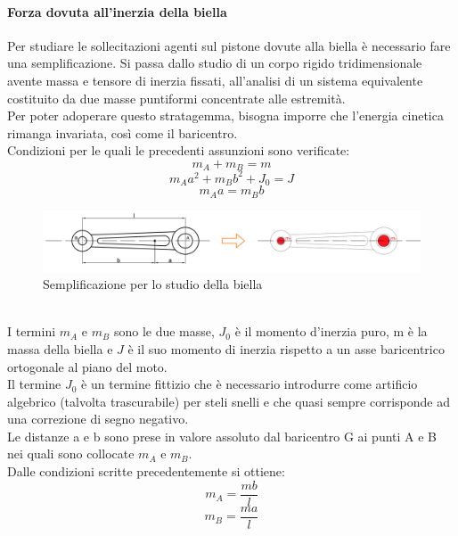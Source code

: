\paragraph{Forza dovuta all'inerzia della biella} Per studiare le sollecitazioni agenti sul pistone dovute alla biella è necessario fare una semplificazione. Si passa dallo studio di un corpo rigido tridimensionale avente massa e tensore di inerzia fissati, all’analisi di un sistema equivalente costituito da due masse puntiformi concentrate alle estremità.\\
Per poter adoperare questo stratagemma, bisogna imporre che l’energia cinetica rimanga invariata, così come il baricentro.\\
Condizioni per le quali le precedenti assunzioni sono verificate: 
\begin{equation}
    m_A+m_B=m
\end{equation}
\begin{equation}
    m_Aa^2+m_Bb^2+J_0=J
\end{equation}
\begin{equation}
    m_Aa=m_Bb
\end{equation}
\begin{figure}[h]
\centering
\includegraphics[scale=0.3]{Immagini/SostituzioneBiella.png}
\caption{Semplificazione per lo studio della biella}
\label{fig:SostituzioneBiella}
\end{figure}
\\
I termini $m_A$ e $m_B$ sono le due masse, $J_0$ è il momento d'inerzia puro, m è la massa della biella e $J$ è il suo momento di inerzia rispetto a un asse baricentrico ortogonale al piano del moto. \\
Il termine $J_0$ è un termine fittizio che è necessario introdurre come artificio algebrico (talvolta trascurabile) per steli snelli e che quasi sempre corrisponde ad una correzione di segno negativo. \\
Le distanze a e b sono prese in valore assoluto dal baricentro G ai punti A e B nei quali sono collocate $m_A$ e $m_B$.\\
Dalle condizioni scritte precedentemente si ottiene: 
\begin{equation}
    m_A=\frac{mb}{l}
\end{equation}
\begin{equation}
    m_B=\frac{ma}{l}
\end{equation}
